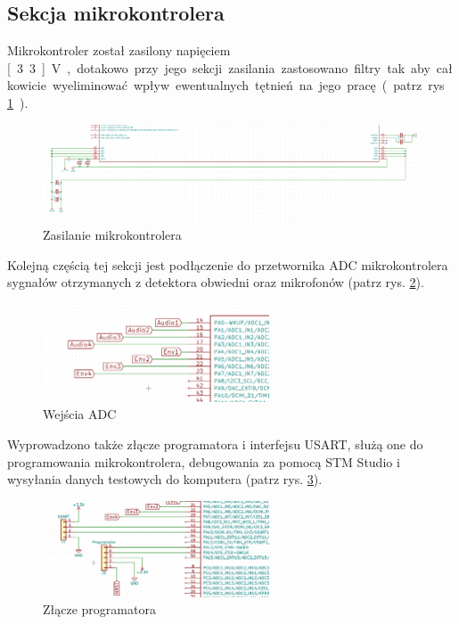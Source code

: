 \documentclass[eng,printmode]{mgr}
\begin{document}
\subsection{Sekcja mikrokontrolera}
Mikrokontroler został zasilony napięciem \unit[3.3]{V}, dotakowo przy jego sekcji zasilania zastosowano filtry tak aby całkowicie wyeliminować wpływ ewentualnych tętnień na jego pracę (patrz rys. \ref{fig-filtry}).
\begin{figure}[ht]

    \centering

  \includegraphics[width=1.1\textwidth, angle=0]{filtry.png}

    \caption{Zasilanie mikrokontrolera}
 \label{fig-filtry}
    

\end{figure}

Kolejną częścią tej sekcji jest podłączenie do przetwornika ADC mikrokontrolera sygnałów otrzymanych z detektora obwiedni oraz mikrofonów (patrz rys. \ref{fig-adc}).
\begin{figure}[ht]

    \centering

  \includegraphics[width=0.6\textwidth, angle=0]{podlaczenie.png}

    \caption{Wejścia ADC}
 \label{fig-adc}
    

\end{figure}

Wyprowadzono także złącze programatora i interfejsu USART, służą one do programowania mikrokontrolera, debugowania za pomocą STM Studio i wysyłania danych testowych do komputera  (patrz rys. \ref{fig-programator}).
\begin{figure}[ht]

    \centering

  \includegraphics[width=0.6\textwidth, angle=0]{usart.png}

    \caption{Złącze programatora}
 \label{fig-programator}
    

\end{figure}
\end{document}
